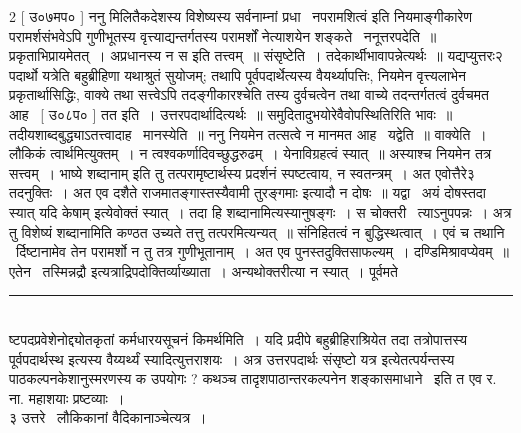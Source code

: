 \documentclass[11pt, openany]{book}
\makeatletter
\newcommand{\devanagarinumeral}[1]{
\devanagaridigits{\number \csname c@#1\endcsname}} %
\makeatother
\begin{document}
\begin{multicols}{2}
 [ उ०७मप० ] ननु मिलितैकदेशस्य विशेष्यस्य {\qt सर्वनाम्नां प्रधा \textendash\ नपरामशित्वं} इति नियमाङ्गीकारेण परामर्शसंभवेऽपि गुणीभूतस्य वृत्त्याद्यन्तर्गतस्य परामर्शों नेत्याशयेन शङ्कते \textendash\ ननूत्तरपदेति~॥ प्रकृताभिप्रायमेतत्~। अप्रधानस्य न स इति तत्त्वम्~॥ संसृष्टेति~। तदेकार्थीभावापन्नेत्यर्थः~॥ यद्यप्युत्तरः२ पदार्थो यत्रेति बहुब्रीहिणा यथाश्रुतं सुयोजम्; तथापि पूर्वपदार्थेत्यस्य वैयर्थ्यापत्तिः, नियमेन वृत्त्यलाभेन प्रकृतार्थासिद्धिः, वाक्ये तथा सत्त्वेऽपि तदङ्गीकारश्चेति तस्य दुर्वचत्वेन तथा वाच्ये तदन्तर्गतत्वं दुर्वचमत आह \textendash\ [ उ०८प० ] तत इति~। उत्तरपदार्थादित्यर्थः~॥ समुदितादुभयोरेवैवोपस्थितिरिति भावः~॥ तदीयशाब्दबुद्ध्याऽतत्त्वादाह \textendash\ मानस्येति~॥ ननु नियमेन तत्सत्वे न मानमत आह \textendash\ यद्वेति~॥ वाक्येति~। लौकिकं त्वार्थमित्युक्तम्~। न त्वश्वकर्णादिवच्छुद्धरुढम्~। येनाविग्रहत्वं स्यात्~॥ अस्याश्च नियमेन तत्र सत्त्वम्~। भाष्ये {\qt शब्दानाम्} इति तु तत्परामृष्टार्थस्य प्रदर्शनं स्पष्टत्वाय, न स्वतन्त्रम्~। अत एवोत्तैरे३ तदनुक्तिः~। अत एव {\qt दशैते राजमातङ्गास्तस्यैवामी तुरङ्गमाः} इत्यादौ न दोषः~॥ यद्वा \textendash\ अयं दोषस्तदा स्यात् यदि {\qt केषाम्} इत्येवोक्तं स्यात्~। तदा हि शब्दानामित्यस्यानुषङ्गः~। स चोक्तरी \textendash\ त्याऽनुपपन्नः~। अत्र तु विशेष्यं शब्दानामिति कण्ठत उच्यते तत्तु तत्परमित्यन्यत्~॥ संनिहितत्वं न बुद्धिस्थत्वात्~। एवं च तथानि \textendash\ र्दिष्टानामेव तेन परामर्शो न तु तत्र गुणीभूतानाम्~। अत एव पुनस्तदुक्तिसाफल्यम्~। दण्डिमिश्रावप्येवम्~॥ एतेन \textendash\ {\qt तस्मिन्नद्रौ} इत्यत्राद्रिपदोक्तिर्व्याख्याता~। अन्यथोक्तरीत्या न स्यात्~। पूर्वमते \textendash\

\noindent
\rule{1\linewidth}{0.5pt}\\

\noindent
ष्टपदप्रवेशेनोद्द्योतकृतां कर्मधारयसूचनं किमर्थमिति~। यदि प्रदीपे बहुब्रीहिराश्रियेत तदा तत्रोपात्तस्य {\qt पूर्वपदार्थस्थ इत्यस्य} वैय्यर्थ्यं स्यादित्युत्तराशयः~। अत्र {\qt उत्तरपदार्थः संसृष्टो यत्र} इत्येतत्पर्यन्तस्य पाठकल्पनकेशानुस्मरणस्य क उपयोगः ? कथञ्च तादृशपाठान्तरकल्पनेन शङ्कासमाधाने \textendash\ इति त एव र. ना. महाशयाः प्रष्टव्याः~।\\

३ उत्तरे \textendash\ लौकिकानां वैदिकानाञ्चेत्यत्र~।\\
\end{multicols}

\fancyhead[RE]{[ १ अ. १ पा. १ पस्पशाह्रिकै}
\fancyhead[LO]{शास्त्रप्रयोजनाधिकरणम् ]}
\fancyhead[LE,RO]{\thepage}
\cfoot{}
\newpage
\renewcommand{\thepage}{\devanagarinumeral{page}}
\setcounter{page}{10}
\end{document}
